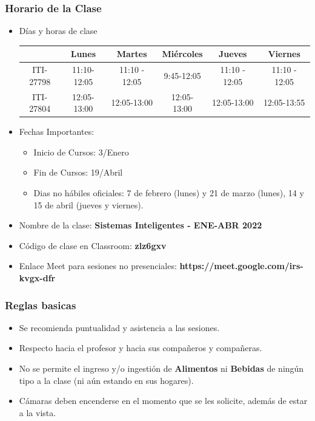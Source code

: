 \documentclass[aspectratio=169]{beamer}
\begin{document}
\begin{frame}
\frametitle{Horario de la Clase}


\begin{itemize}
\item Días y horas de clase
\tiny
\begin{spacing}{1.0}
\begin{center}
\begin{tabular}{c|ccccc}
\hline 
          & Lunes       & Martes        & Miércoles   & Jueves & Viernes       \\  \hline 
ITI-27798 & 11:10-12:05 & 11:10 - 12:05 & 9:45-12:05 &  11:10 - 12:05   & 11:10 - 12:05  \\
ITI-27804 & 12:05-13:00 & 12:05-13:00 & 12:05-13:00 &  12:05-13:00      & 12:05-13:55  \\      
\hline
\end{tabular}
\end{center}
\end{spacing}
\normalsize


\item Fechas Importantes:
\begin{itemize}
\item Inicio de Cursos: 3/Enero
\item Fin de Cursos: 19/Abril
\item Dias no hábiles oficiales: 7 de febrero (lunes) y 21 de marzo (lunes), 14 y 15 de abril (jueves y viernes). 
\end{itemize}
\end{itemize}

\end{frame}


\begin{frame}
\begin{itemize}
\frametitle{Plataforma Virtual para el Curso}
\item Nombre de la clase: \textbf{Sistemas Inteligentes - ENE-ABR 2022}
\item Código de clase en Classroom: \textbf{zlz6gxv}
\item Enlace Meet para sesiones no presenciales: \textbf{https://meet.google.com/irs-kvgx-dfr}
\end{itemize}

\end{frame}


\begin{frame}
\frametitle{Reglas basicas}
\begin{itemize}
\item Se recomienda puntualidad y asistencia a las sesiones.
\item Respecto hacia el profesor y hacia sus compañeros y compañeras.  
\item No se permite el ingreso y/o ingestión de \textbf{Alimentos} ni \textbf{Bebidas} de ningún tipo a la clase (ni aún estando en sus hogares). 
\item Cámaras deben encenderse en el momento que se les solicite, además de estar a la vista. 
\end{itemize}
\end{frame}
\end{document}
